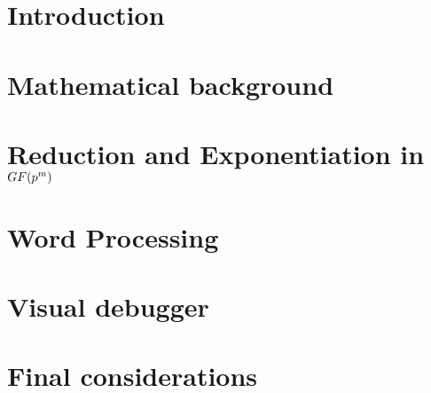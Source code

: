 \documentclass{ufscThesis}
\begin{document}
\capa  
\folhaderosto %
\paginaresumo
\paginaabstract
\listadefiguras
\listadetabelas 
\sumario

\chapter{Introduction}


\chapter{Mathematical background}\label{cap:background}


\chapter{Reduction and Exponentiation in $GF(\MakeLowercase{p}^\MakeLowercase{m})$}\label{chapters/reduction_squaring_2}


\chapter{Word Processing}\label{chapters/word_processing}


\chapter{Visual debugger}\label{chapters/visual_debugger}


\chapter{Final considerations}\label{chapters/final_considerations}

\end{document}
